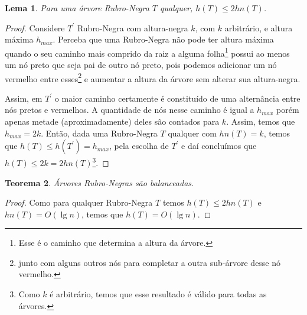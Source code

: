 \documentclass[11pt,twoside]{article}
\newtheorem{theorem}{Teorema}[section]
\newtheorem{lemma}[theorem]{Lema}
\theoremstyle{definition}
\begin{document}
\begin{lemma}
	Para uma árvore Rubro-Negra \( T \) qualquer, \( h(T) \leq 2 hn(T) \).
\end{lemma}
\begin{proof}
	Considere \( T^\prime \) Rubro-Negra com altura-negra \( k \), com \( k \) arbitrário, e altura máxima \( h_{max} \). Perceba que uma Rubro-Negra não pode ter altura máxima quando o seu caminho mais comprido da raiz a alguma folha\footnote{Esse é o caminho que determina a altura da árvore.} possui ao menos um nó preto que seja pai de outro nó preto, pois podemos adicionar um nó vermelho entre esses\footnote{junto com alguns outros nós para completar a outra sub-árvore desse nó vermelho.} e aumentar a altura da árvore sem alterar sua altura-negra.

	Assim, em \( T^\prime \) o maior caminho certamente é constituído de uma alternância entre nós pretos e vermelhos. A quantidade de nós nesse caminho é igual a \( h_{max} \) porém apenas metade (aproximadamente) deles são contados para \( k \). Assim, temos que \( h_{max} = 2 k \). Então, dada uma Rubro-Negra \( T \) qualquer com \( hn(T) = k \), temos que \( h(T) \leq h(T^\prime) = h_{max} \), pela escolha de \( T^\prime \) e daí concluímos que \( h(T) \leq 2k = 2hn(T) \)\footnote{Como \( k \) é arbitrário, temos que esse resultado é válido para todas as árvores.}.
\end{proof}

\begin{theorem}
	Árvores Rubro-Negras são balanceadas.
\end{theorem}
\begin{proof}
	Como para qualquer Rubro-Negra \( T \) temos \( h(T) \leq 2 hn(T) \) e \( hn(T) = O(\lg n) \), temos que \( h(T) = O(\lg n) \).
\end{proof}

\printbibliography
\end{document}
